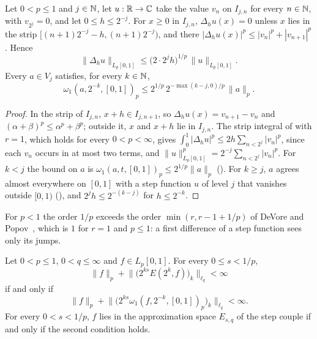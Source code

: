 \begin{lemma}
\label{lem:step-inverse-below-one}
\leanok
{}
Let $0 < p \leq 1$ and $j \in \mathbb{N}$, let $u : \mathbb{R} \to \mathbb{C}$ take the value $v_n$ on $I_{j,n}$ for
every $n \in \mathbb{N}$, with $v_{2^j} = 0$, and let $0 \leq h \leq 2^{-j}$. For $x \geq 0$ in
$I_{j,n}$, $\Delta_h u(x) = 0$ unless $x$ lies in the strip $[(n+1) 2^{-j} - h, (n+1) 2^{-j})$, and
there $|\Delta_h u(x)|^p \leq |v_n|^p + |v_{n+1}|^p$. Hence
\[
  \|\Delta_h u\|_{L_p[0, 1]} \leq \bigl(2 \cdot 2^j h\bigr)^{1/p} \, \|u\|_{L_p[0, 1]} .
\]
Every $a \in V_j$ satisfies, for every $k \in \mathbb{N}$,
\[
  \omega_1(a, 2^{-k}, [0, 1])_p \leq 2^{1/p} \, 2^{-\max(k - j, 0)/p} \, \|a\|_p .
\]
\end{lemma}

\begin{proof}
\leanok
In the strip of $I_{j,n}$, $x + h \in I_{j, n+1}$, so $\Delta_h u(x) = v_{n+1} - v_n$ and
$(\alpha + \beta)^p \leq \alpha^p + \beta^p$; outside it, $x$ and $x + h$ lie in $I_{j,n}$. The
strip integral of  with $r = 1$, which holds for every $0 < p < \infty$, gives
$\int_0^1 |\Delta_h u|^p \leq 2 h \sum_{n < 2^j} |v_n|^p$, since each $v_n$ occurs in at most two
terms, and $\|u\|_{L_p[0, 1]}^p = 2^{-j} \sum_{n < 2^j} |v_n|^p$. For $k < j$ the bound on $a$ is
$\omega_1(a, t, [0, 1])_p \leq 2^{1/p} \|a\|_p$ (). For $k \geq j$,
$a$ agrees almost everywhere on $[0, 1]$ with a step function $u$ of level $j$ that vanishes
outside $[0, 1)$ (), and $2^j h \leq 2^{-(k - j)}$ for $h \leq 2^{-k}$.
\end{proof}

For $p < 1$ the order $1/p$ exceeds the order $\min(r, r - 1 + 1/p)$ of DeVore and
Popov~\cite[Theorem~4.8]{DeVorePopovTAMS}, which is $1$ for $r = 1$ and $p \leq 1$: a first
difference of a step function sees only its jumps.

\begin{theorem}
\label{thm:steps-besov-below-one}
\leanok
{}
Let $0 < p \leq 1$, $0 < q \leq \infty$ and $f \in L_p[0, 1]$. For every $0 \leq s < 1/p$,
\[
  \|f\|_p + \bigl\| \bigl( 2^{ks} E(2^k, f) \bigr)_k \bigr\|_{\ell_q} < \infty
\]
if and only if
\[
  \|f\|_p + \bigl\| \bigl( 2^{ks} \omega_1(f, 2^{-k}, [0, 1])_p \bigr)_k \bigr\|_{\ell_q}
  < \infty .
\]
For every $0 < s < 1/p$, $f$ lies in the approximation space $E_{s, q}$ of the step couple if and
only if the second condition holds.
\end{theorem}


